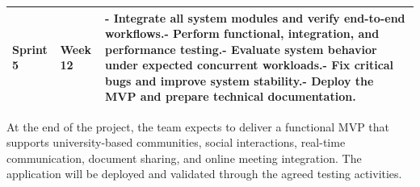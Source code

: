 \documentclass[12pt]{article}
\begin{document}
\begin{longtable}{|>{\raggedright\arraybackslash}p{}|>{\raggedright\arraybackslash}p{}|>{\raggedright\arraybackslash}p{}|}
\textbf{Sprint 5} & Week 12 & - Integrate all system modules and verify end-to-end workflows.\newline{}- Perform functional, integration, and performance testing.\newline{}- Evaluate system behavior under expected concurrent workloads.\newline{}- Fix critical bugs and improve system stability.\newline{}- Deploy the MVP and prepare technical documentation. \\ \hline
\end{longtable}
\endgroup
\par\medskip
At the end of the project, the team expects to deliver a functional MVP that supports university-based communities, social interactions, real-time communication, document sharing, and online meeting integration. The application will be deployed and validated through the agreed testing activities.
\par\medskip
\hypertarget{sec:423-releases}{}
\end{document}
